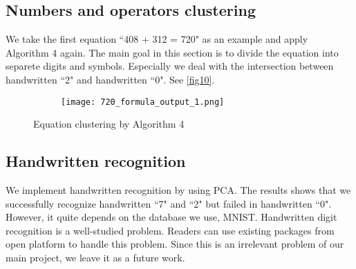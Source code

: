 \subsection{Numbers and operators clustering}
We take the first equation ``408 + 312 = 720" as an example and apply Algorithm 4 again.
The main goal in this section is to divide the equation into separete digits and symbols. Especially we deal with the intersection between handwritten ``2" and handwritten ``0". See \autoref{fig10}.

\begin{figure}[htbp]
    \vspace{-1em}
    \centering
    \begin{subfigure}[t]{0.6\textwidth}
        \texttt{[image: 720\_formula\_output\_1.png]}
    \end{subfigure}
    \caption{Equation clustering by Algorithm 4}\label{fig10}
\end{figure}

\subsection{Handwritten recognition}
We implement handwritten recognition by using PCA. 
The results shows that we successfully recognize handwritten ``7" and ``2" but failed in handwritten ``0". 
However, it quite depends on the database we use, MNIST.
Handwritten digit recognition is a well-studied problem. Readers can use existing packages from open platform to handle this problem.
Since this is an irrelevant problem of our main project, we leave it as a future work.
